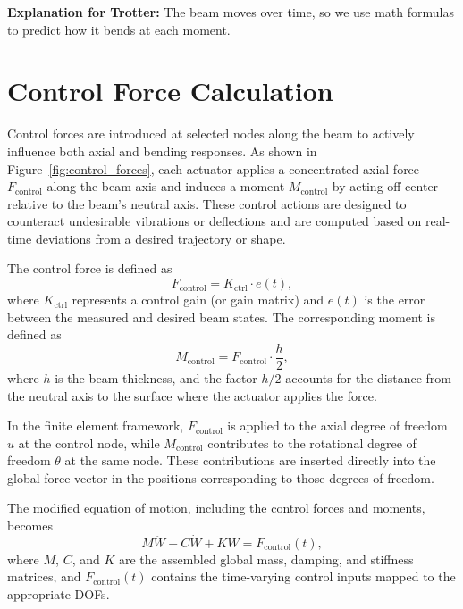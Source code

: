 \documentclass{article}
\begin{document}
	\textbf{Explanation for Trotter:} The beam moves over time, so we use math formulas to predict how it bends at each moment.
	
	\section*{Control Force Calculation}
	Control forces are introduced at selected nodes along the beam to actively influence both axial and bending responses. As shown in Figure~\ref{fig:control_forces}, each actuator applies a concentrated axial force \( F_{\text{control}} \) along the beam axis and induces a moment \( M_{\text{control}} \) by acting off-center relative to the beam’s neutral axis. These control actions are designed to counteract undesirable vibrations or deflections and are computed based on real-time deviations from a desired trajectory or shape.
	
	The control force is defined as
	\begin{equation}
		F_{\text{control}} = K_{\text{ctrl}} \cdot e(t),
	\end{equation}
	where \( K_{\text{ctrl}} \) represents a control gain (or gain matrix) and \( e(t) \) is the error between the measured and desired beam states. The corresponding moment is defined as
	\begin{equation}
		M_{\text{control}} = F_{\text{control}} \cdot \frac{h}{2},
	\end{equation}
	where \( h \) is the beam thickness, and the factor \( h/2 \) accounts for the distance from the neutral axis to the surface where the actuator applies the force.
	
	In the finite element framework, \( F_{\text{control}} \) is applied to the axial degree of freedom \( u \) at the control node, while \( M_{\text{control}} \) contributes to the rotational degree of freedom \( \theta \) at the same node. These contributions are inserted directly into the global force vector in the positions corresponding to those degrees of freedom.
	
	The modified equation of motion, including the control forces and moments, becomes
	\begin{equation}
		M \ddot{W} + C \dot{W} + K W = F_{\text{control}}(t),
	\end{equation}
	where \( M \), \( C \), and \( K \) are the assembled global mass, damping, and stiffness matrices, and \( F_{\text{control}}(t) \) contains the time-varying control inputs mapped to the appropriate DOFs.
	
\end{document}
